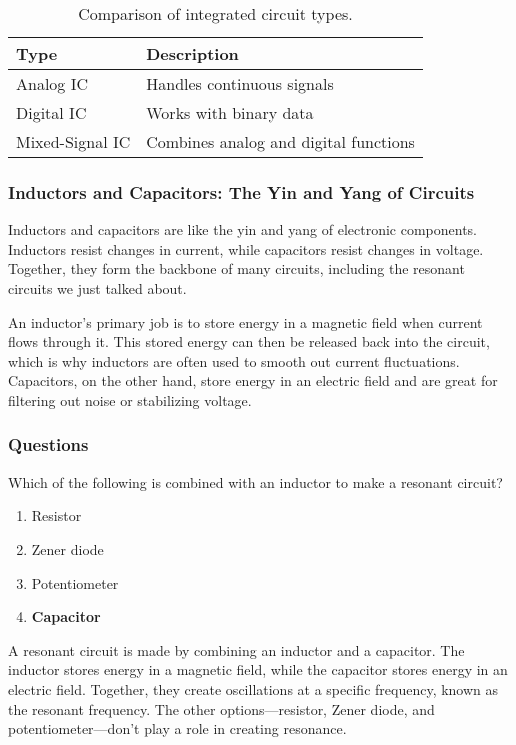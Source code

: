 \begin{table}[h!]
    \centering
    \begin{tabular}{|l|l|}
        \hline
        \textbf{Type} & \textbf{Description} \\
        \hline
        Analog IC & Handles continuous signals \\
        Digital IC & Works with binary data \\
        Mixed-Signal IC & Combines analog and digital functions \\
        \hline
    \end{tabular}
    \caption{Comparison of integrated circuit types.}
    \label{tab:ics}
\end{table}

\subsubsection*{Inductors and Capacitors: The Yin and Yang of Circuits}
Inductors and capacitors are like the yin and yang of electronic components. Inductors resist changes in current, while capacitors resist changes in voltage. Together, they form the backbone of many circuits, including the resonant circuits we just talked about.

An inductor’s primary job is to store energy in a magnetic field when current flows through it. This stored energy can then be released back into the circuit, which is why inductors are often used to smooth out current fluctuations. Capacitors, on the other hand, store energy in an electric field and are great for filtering out noise or stabilizing voltage.

\subsubsection*{Questions}
\begin{tcolorbox}[colback=gray!10!white,colframe=black!75!black,title={T6D08}]
Which of the following is combined with an inductor to make a resonant circuit?
\begin{enumerate}[label=\Alph*),noitemsep]
    \item Resistor
    \item Zener diode
    \item Potentiometer
    \item \textbf{Capacitor}
\end{enumerate}
\end{tcolorbox}
A resonant circuit is made by combining an inductor and a capacitor. The inductor stores energy in a magnetic field, while the capacitor stores energy in an electric field. Together, they create oscillations at a specific frequency, known as the resonant frequency. The other options—resistor, Zener diode, and potentiometer—don’t play a role in creating resonance.

